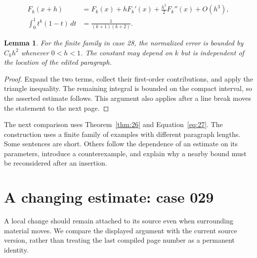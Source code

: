 \documentclass[a4paper,10pt]{article}
\newtheorem{lemma}[theorem]{Lemma}
\begin{document}
\lipsum[22-23]
\begin{align}\label{eq:27}
 F_k(x+h)&=F_k(x)+hF_k'(x)+\frac{h^2}{2}F_k''(x)+O(h^3),\\
 \int_0^1 t^k(1-t)\,dt&=\frac{1}{(k+1)(k+2)}.
\end{align}
\begin{lemma}\label{thm:27}
For the finite family in case 28, the normalized error is bounded by $C_k h^2$ whenever $0<h<1$. The constant may depend on $k$ but is independent of the location of the edited paragraph.
\end{lemma}
\begin{proof}
Expand the two terms, collect their first-order contributions, and apply the
triangle inequality. The remaining integral is bounded on the compact interval,
so the asserted estimate follows. This argument also applies after a line break
moves the statement to the next page.
\end{proof}
\begin{center}
\end{center}
The next comparison uses Theorem~\ref{thm:26} and Equation~\ref{eq:27}. The construction uses a finite family of examples with different paragraph lengths. Some sentences are short. Others follow the dependence of an estimate on its parameters, introduce a counterexample, and explain why a nearby bound must be reconsidered after an insertion.

\lipsum[13]

\section{A changing estimate: case 029}\label{unit:28}
A local change should remain attached to its source even when surrounding material moves. We compare the displayed argument with the current source version, rather than treating the last compiled page number as a permanent identity.
\end{document}
